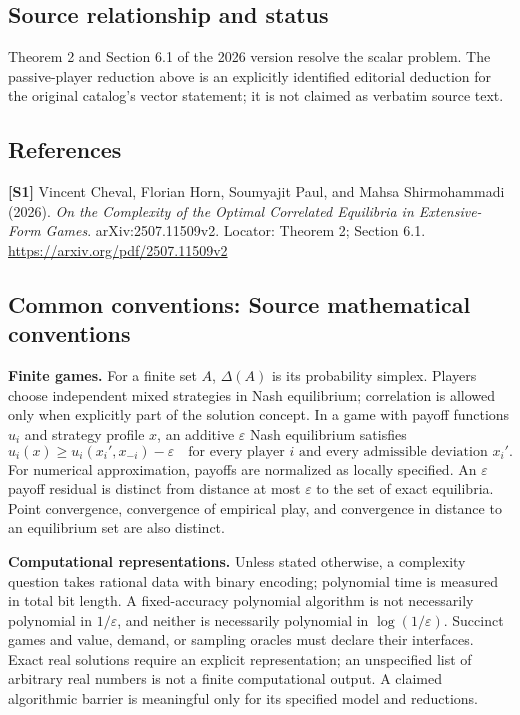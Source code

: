 \documentclass[11pt,a4paper]{article}
\begin{document}
\subsection*{Source relationship and status}
Theorem 2 and Section 6.1 of the 2026 version resolve the scalar problem. The passive-player reduction above is an explicitly identified editorial deduction for the original catalog's vector statement; it is not claimed as verbatim source text.
\subsection*{References}
\begingroup\footnotesize\raggedright
{\footnotesize\raggedright
\textbf{[S1]} Vincent Cheval, Florian Horn, Soumyajit Paul, and Mahsa Shirmohammadi (2026). \emph{On the Complexity of the Optimal Correlated Equilibria in Extensive-Form Games}. arXiv:2507.11509v2. Locator: Theorem 2; Section 6.1. \url{https://arxiv.org/pdf/2507.11509v2}\par}
\par\endgroup

\subsection*{Common conventions: Source mathematical conventions}

\textbf{Finite games.} For a finite set $A$, $\Delta(A)$ is its probability
simplex. Players choose independent mixed strategies in Nash equilibrium;
correlation is allowed only when explicitly part of the solution concept.
In a game with payoff functions $u_i$ and strategy profile $x$, an additive
$\varepsilon$ Nash equilibrium satisfies
\[
 u_i(x)\geq u_i(x_i',x_{-i})-\varepsilon
 \quad\text{for every player $i$ and every admissible deviation $x_i'$}.
\]
For numerical approximation, payoffs are normalized as locally specified.
An $\varepsilon$ payoff residual is distinct from distance at most
$\varepsilon$ to the set of exact equilibria. Point convergence, convergence
of empirical play, and convergence in distance to an equilibrium set are
also distinct.

\textbf{Computational representations.} Unless stated otherwise, a complexity
question takes rational data with binary encoding; polynomial time is measured
in total bit length. A fixed-accuracy polynomial algorithm is not necessarily
polynomial in $1/\varepsilon$, and neither is necessarily polynomial in
$\log(1/\varepsilon)$. Succinct games and value, demand, or sampling oracles
must declare their interfaces. Exact real solutions require an explicit
representation; an unspecified list of arbitrary real numbers is not a
finite computational output. A claimed algorithmic barrier is meaningful
only for its specified model and reductions.
\end{document}
